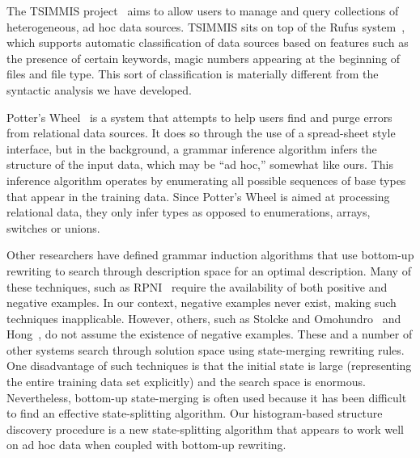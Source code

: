 The TSIMMIS project~\cite{chawathe+:tsimmis} aims to
allow users to manage and query collections of heterogeneous, ad hoc
data sources.  TSIMMIS sits on top of the Rufus
system~\cite{shoens+:rufus}, which supports automatic classification
of data sources based on features such as the presence of certain
keywords, magic numbers appearing at the beginning of files and file
type.  
This sort of classification is materially
different from the syntactic analysis we have developed.


Potter's Wheel~\cite{raman+:potterwheel} is a system that attempts to
help users find and purge errors from
relational data sources.  It does so through the use of a spread-sheet
style interface, but in the background, a grammar inference algorithm
infers the structure of the input data, which may be ``ad hoc,'' 
somewhat like ours.  This inference algorithm operates by
enumerating all possible sequences of base types that appear
in the training data.  
Since Potter's Wheel is aimed at processing
relational data, they only infer  types
as opposed to enumerations, arrays, switches or unions.  

Other researchers have defined grammar induction algorithms that use
bottom-up rewriting to search through description space for an optimal
description.  Many of these techniques, such as RPNI~\cite{rpni} 
require the availability of both
positive and negative examples.  In our context, negative examples
never exist, making such techniques inapplicable.
However, others, such as Stolcke and
Omohundro~\cite{stolcke94inducing} and Hong~\cite{hong01using}, do not
assume the existence of negative examples.  These and a number of other systems
search through solution space using
state-merging rewriting rules.  One disadvantage of such
techniques is that the initial state is large (representing
the entire training data set explicitly) and the search space is 
enormous.  Nevertheless, bottom-up state-merging is often used because
it has been difficult to find an effective state-splitting algorithm.
Our histogram-based structure discovery procedure is a new state-splitting
algorithm that appears to work well on ad hoc data when coupled with
bottom-up rewriting.

